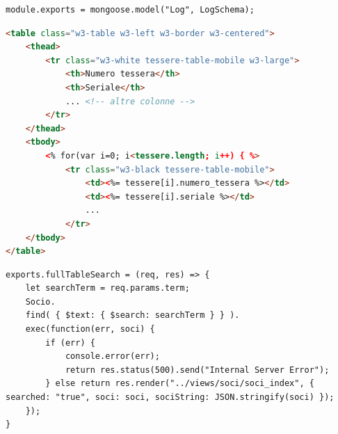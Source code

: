 \documentclass[12pt]{report}
\begin{document}
\begin{itemize}
\begin{lstlisting}[caption={Creazione del modello dei log con \emph{mongoose}}, label={lst:model}, xleftmargin=\dimexpr-\leftmargini]
module.exports = mongoose.model("Log", LogSchema);
\end{lstlisting}
\begin{lstlisting}[language=HTML, morekeywords={if, else}, caption={Parte del codice HTML della vista creata per presentare le tessere all'utente}, label={lst:view}, xleftmargin=\dimexpr-\leftmargini]
<table class="w3-table w3-left w3-border w3-centered">
	<thead>
		<tr class="w3-white tessere-table-mobile w3-large">
			<th>Numero tessera</th>
			<th>Seriale</th>
			... <!-- altre colonne -->
		</tr>
	</thead>
	<tbody>
		<% for(var i=0; i<tessere.length; i++) { %>
			<tr class="w3-black tessere-table-mobile">
				<td><%= tessere[i].numero_tessera %></td>
				<td><%= tessere[i].seriale %></td>
				...
			</tr>
	</tbody>
</table>
\end{lstlisting}
\begin{lstlisting}[caption={Parte del codice del controller creato per gestire i comandi relativi ai soci.  Questa funzione, quando viene chiamata, cerca nel database i soci in base al termine inviato tra i parametri e poi carica una pagina con i risultati.}, label={lst:controller}, xleftmargin=\dimexpr-\leftmargini]
exports.fullTableSearch = (req, res) => {
	let searchTerm = req.params.term;
	Socio.
	find( { $text: { $search: searchTerm } } ).
	exec(function(err, soci) {
		if (err) {
			console.error(err);
			return res.status(500).send("Internal Server Error");
		} else return res.render("../views/soci/soci_index", { searched: "true", soci: soci, sociString: JSON.stringify(soci) });
	});
}
\end{lstlisting}
	 
\end{itemize}
\end{document}
